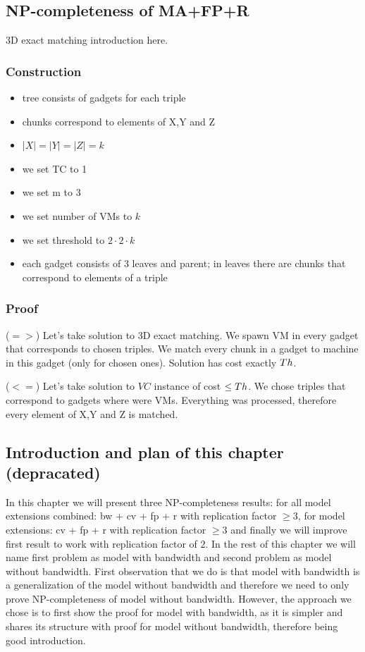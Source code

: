 \subsection{NP-completeness of MA+FP+R}

3D exact matching introduction here.

\subsubsection{Construction}

\begin{itemize}
\item tree consists of gadgets for each triple
\item chunks correspond to elements of X,Y and Z
\item $|X| = |Y| = |Z| = k$
\item we set TC to 1
\item we set m to 3
\item we set number of VMs to $k$
\item we set threshold to $2 \cdot 2 \cdot k$
\item each gadget consists of 3 leaves and parent; in leaves there are
  chunks that correspond to elements of a triple
\end{itemize}

\subsubsection{Proof} 

($=>$) Let's take solution to 3D exact matching. We spawn VM in every
gadget that corresponds to chosen triples. We match every chunk in a
gadget to machine in this gadget (only for chosen ones). Solution has
cost exactly $Th$.

($<=$) Let's take solution to $VC$ instance of cost $\leq Th$. We
chose triples that correspond to gadgets where were VMs. Everything
was processed, therefore every element of X,Y and Z is matched.

\subsection{Introduction and plan of this chapter (depracated)}

In this chapter we will present three NP-completeness results: for all
model extensions combined: bw + cv + fp + r with replication factor
$\geq 3$, for model extensions: cv + fp + r with replication factor
$\geq 3$ and finally we will improve first result to work with
replication factor of $2$. In the rest of this chapter we will name
first problem as model with bandwidth and second problem as model
without bandwidth. First observation that we do is that model with
bandwidth is a generalization of the model without bandwidth and
therefore we need to only prove NP-completeness of model without
bandwidth. However, the approach we chose is to first show the proof
for model with bandwidth, as it is simpler and shares its structure
with proof for model without bandwidth, therefore being good
introduction.

